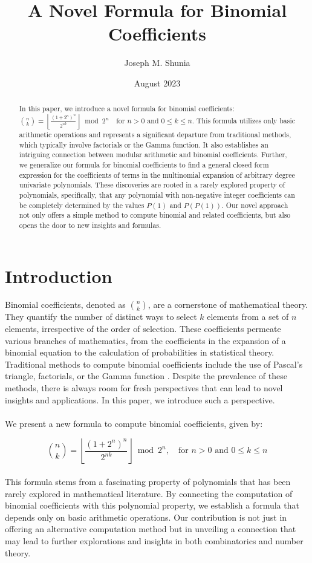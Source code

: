 \documentclass{article}
\title{A Novel Formula for Binomial Coefficients}
\author{Joseph M. Shunia}
\date{August 2023}
\theoremstyle{plain}
\begin{document}
\maketitle

\begin{abstract}
In this paper, we introduce a novel formula for binomial coefficients: \(\binom{n}{k} = \left\lfloor\frac{(1 + 2^{n})^{n}}{2^{n k}}\right\rfloor \bmod{2^{n}} \quad \text{for } n > 0 \text{ and } 0 \leq k \leq n\). This formula utilizes only basic arithmetic operations and represents a significant departure from traditional methods, which typically involve factorials or the Gamma function. It also establishes an intriguing connection between modular arithmetic and binomial coefficients. Further, we generalize our formula for binomial coefficients to find a general closed form expression for the coefficients of terms in the multinomial expansion of arbitrary degree univariate polynomials. These discoveries are rooted in a rarely explored property of polynomials, specifically, that any polynomial with non-negative integer coefficients can be completely determined by the values \(P(1)\) and \(P(P(1))\). Our novel approach not only offers a simple method to compute binomial and related coefficients, but also opens the door to new insights and formulas.
\end{abstract}

\section{Introduction}
Binomial coefficients, denoted as \(\binom{n}{k}\), are a cornerstone of mathematical theory. They quantify the number of distinct ways to select \(k\) elements from a set of \(n\) elements, irrespective of the order of selection. These coefficients permeate various branches of mathematics, from the coefficients in the expansion of a binomial equation to the calculation of probabilities in statistical theory. Traditional methods to compute binomial coefficients include the use of Pascal's triangle, factorials, or the Gamma function \cite{brualdi1992introductory}. Despite the prevalence of these methods, there is always room for fresh perspectives that can lead to novel insights and applications. In this paper, we introduce such a perspective.
\\
\\
We present a new formula to compute binomial coefficients, given by:

\begin{equation}
\binom{n}{k} = \left\lfloor\frac{(1 + 2^{n})^{n}}{2^{n k}}\right\rfloor \bmod{2^{n}}, \quad \text{for } n > 0 \text{ and } 0 \leq k \leq n
\end{equation}
\\
This formula stems from a fascinating property of polynomials that has been rarely explored in mathematical literature. By connecting the computation of binomial coefficients with this polynomial property, we establish a formula that depends only on basic arithmetic operations. Our contribution is not just in offering an alternative computation method but in unveiling a connection that may lead to further explorations and insights in both combinatorics and number theory.
\end{document}
